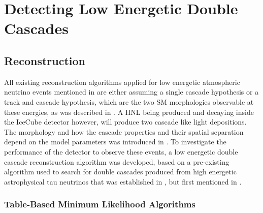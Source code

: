 \setchapterpreamble[u]{\margintoc}

\chapter{Detecting Low Energetic Double Cascades}


\section{Reconstruction} 

All existing reconstruction algorithms applied for low energetic atmospheric neutrino events mentioned in  are either assuming a single cascade hypothesis or a track and cascade hypothesis, which are the two SM morphologies observable at these energies, as was described in . A HNL being produced and decaying inside the IceCube detector however, will produce two cascade like light depositions. The morphology and how the cascade properties and their spatial separation depend on the model parameters was introduced in . To investigate the performance of the detector to observe these events, a low energetic double cascade reconstruction algorithm was developed, based on a pre-existing algorithm used to search for double cascades produced from high energetic astrophysical tau neutrinos  that was established in , but first mentioned in .


\subsection{Table-Based Minimum Likelihood Algorithms}

